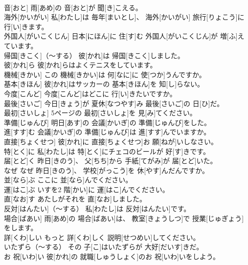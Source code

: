 \documentclass[8pt]{extreport}
\begin{document}
\begin{CJK}{UTF8}{min}
\\	音[おと]	雨[あめ]の 音[おと]が 聞[き]こえる。		
\\	海外[かいがい]	私[わたし]は 毎年[まいとし]、 海外[かいがい] 旅行[りょこう]に 行[い]きます。		
\\	外国人[がいこくじん]	日本[にほん]に 住[す]む 外国人[がいこくじん]が 増[ふ]えています。		
\\	帰国[きこく]（～する）	彼[かれ]は 帰国[きこく]しました。		
\\	彼[かれ]ら	彼[かれ]らはよくテニスをしています。		
\\	機械[きかい]	この 機械[きかい]は 何[なに]に 使[つか]うんですか。		
\\	基本[きほん]	彼[かれ]はサッカーの 基本[きほん]を 知[し]らない。		
\\	今度[こんど]	今度[こんど]はどこに 行[い]きたいですか。		
\\	最後[さいご]	今日[きょう]が 夏休[なつやす]み 最後[さいご]の 日[ひ]だ。		
\\	最初[さいしょ]	5ページの 最初[さいしょ]を 見[み]てください。		
\\	準備[じゅんび]	明日[あす]の 会議[かいぎ]の 準備[じゅんび]をした。		
\\	進[すす]む	会議[かいぎ]の 準備[じゅんび]は 進[すす]んでいますか。		
\\	直接[ちょくせつ]	彼[かれ]に 直接[ちょくせつ]お 願[ねが]いしなさい。		
\\	特[とく]に	私[わたし]は 特[とく]にチェコのビールが 好[す]きです。		
\\	届[とど]く	昨日[きのう]、 父[ちち]から 手紙[てがみ]が 届[とど]いた。		
\\	なぜ	なぜ 昨日[きのう]、 学校[がっこう]を 休[やす]んだんですか。		
\\	並[なら]ぶ	ここに 並[なら]んでください。		
\\	運[はこ]ぶ	いすを2 階[かい]に 運[はこ]んでください。		
\\	直[なお]す	あたしがそれを 直[なお]しました。		
\\	反対[はんたい]（～する）	私[わたし]は 反対[はんたい]です。		
\\	場合[ばあい]	雨[あめ]の 場合[ばあい]は、 教室[きょうしつ]で 授業[じゅぎょう]をします。		
\\	詳[くわ]しい	もっと 詳[くわ]しく 説明[せつめい]してください。		
\\	いたずら（～する）	その 子[こ]はいたずらが 大好[だいす]きだ。		
\\	お 祝[いわ]い	彼[かれ]の 就職[しゅうしょく]のお 祝[いわ]いをしよう。		

\end{CJK}
\end{document}
